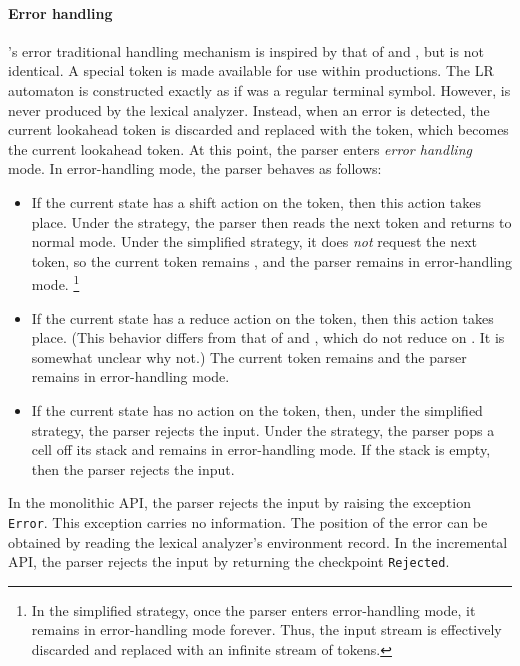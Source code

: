 \documentclass[onecolumn,11pt,nocopyrightspace,preprint]{sigplanconf}
\begin{document}
\paragraph{Error handling}

\menhir's error traditional handling mechanism is inspired by that of \yacc and
\ocamlyacc, but is not identical. A special \error token is made available
for use within productions. The LR automaton is constructed exactly as if
\error was a regular terminal symbol. However, \error is never produced
by the lexical analyzer. Instead, when an error is detected, the current
lookahead token is discarded and replaced with the \error token, which becomes
the current lookahead token. At this point, the parser enters \emph{error
handling} mode.
%
In error-handling mode, the parser behaves as follows:
\begin{itemize}
\item If the current state has a shift action on the \error token, then this
  action takes place. Under the \legacy strategy, the parser then
  reads the next token and returns to normal mode. Under the
  simplified strategy, it does \emph{not} request the next token, so
  the current token remains \error, and the parser remains in error-handling
  mode.%
  \footnote{In the simplified strategy, once the parser enters error-handling
  mode, it remains in error-handling mode forever. Thus, the input stream is
  effectively discarded and replaced with an infinite stream of \error tokens.}
\item If the current state has a reduce action on the \error token, then this
  action takes place. (This behavior differs from that of \yacc and
  \ocamlyacc, which do not reduce on \error. It is somewhat unclear why not.)
  The current token remains \error and the parser remains in error-handling
  mode.
\item If the current state has no action on the \error token, then, under the
  simplified strategy, the parser rejects the input. Under the
  \legacy strategy, the parser pops a cell off its stack and remains
  in error-handling mode. If the stack is empty, then the parser rejects the
  input.
\end{itemize}

In the monolithic API, the parser rejects the input by raising the exception
\texttt{Error}. This exception carries no information. The position of the
error can be obtained by reading the lexical analyzer's environment record. In
the incremental API, the parser rejects the input by returning the checkpoint
\texttt{Rejected}.
\end{document}
